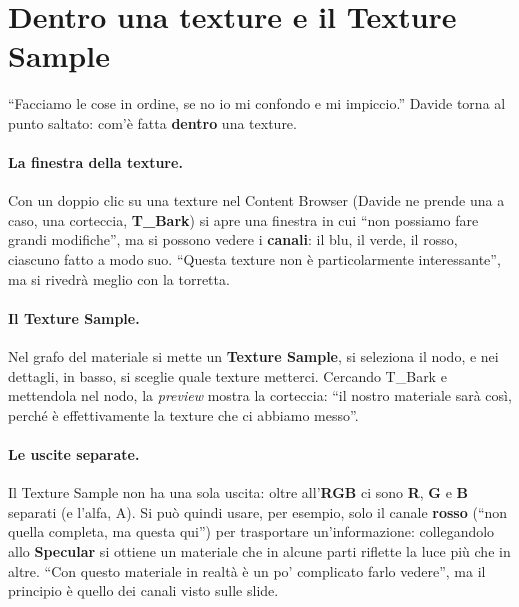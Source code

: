 \section{Dentro una texture e il Texture Sample}
\label{ue3:sec:sample}

``Facciamo le cose in ordine, se no io mi confondo e mi impiccio.'' Davide torna al
punto saltato: com'è fatta \textbf{dentro} una texture.

\paragraph{La finestra della texture.} Con un doppio clic su una texture nel Content
Browser (Davide ne prende una a caso, una corteccia, \textbf{T\_Bark}) si apre una
finestra in cui ``non possiamo fare grandi modifiche'', ma si possono vedere i
\textbf{canali}: il blu, il verde, il rosso, ciascuno fatto a modo suo. ``Questa texture
non è particolarmente interessante'', ma si rivedrà meglio con la torretta.

\paragraph{Il Texture Sample.} Nel grafo del materiale si mette un \textbf{Texture
Sample}, si seleziona il nodo, e nei dettagli, in basso, si sceglie quale texture
metterci. Cercando T\_Bark e mettendola nel nodo, la \emph{preview} mostra la corteccia:
``il nostro materiale sarà così, perché è effettivamente la texture che ci abbiamo
messo''.

\paragraph{Le uscite separate.} Il Texture Sample non ha una sola uscita: oltre
all'\textbf{RGB} ci sono \textbf{R}, \textbf{G} e \textbf{B} separati (e l'alfa, A). Si
può quindi usare, per esempio, solo il canale \textbf{rosso} (``non quella completa, ma
questa qui'') per trasportare un'informazione: collegandolo allo \textbf{Specular} si
ottiene un materiale che in alcune parti riflette la luce più che in altre. ``Con
questo materiale in realtà è un po' complicato farlo vedere'', ma il principio è quello
dei canali visto sulle slide.

